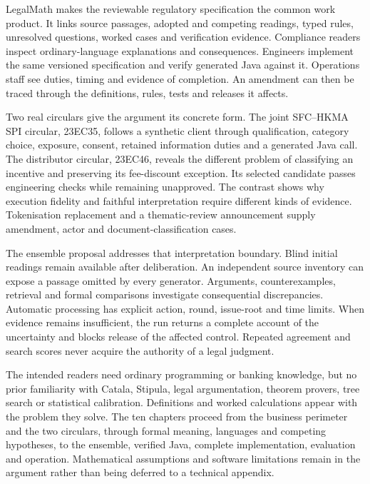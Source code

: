 \documentclass[12pt,a4paper,oneside,openany]{book}
\begin{document}
LegalMath makes the reviewable regulatory specification the common work product.
It links source passages, adopted and competing readings, typed rules, unresolved
questions, worked cases and verification evidence. Compliance readers inspect
ordinary-language explanations and consequences. Engineers implement the same
versioned specification and verify generated Java against it. Operations staff
see duties, timing and evidence of completion. An amendment can then be traced
through the definitions, rules, tests and releases it affects.

Two real circulars give the argument its concrete form. The joint SFC--HKMA SPI
circular, 23EC35, follows a synthetic client through qualification, category
choice, exposure, consent, retained information duties and a generated Java
call. The distributor circular, 23EC46, reveals the different problem of
classifying an incentive and preserving its fee-discount exception. Its selected
candidate passes engineering checks while remaining unapproved. The contrast
shows why execution fidelity and faithful interpretation require different
kinds of evidence. Tokenisation replacement and a thematic-review announcement
supply amendment, actor and document-classification cases.

The ensemble proposal addresses that interpretation boundary. Blind initial
readings remain available after deliberation. An independent source inventory
can expose a passage omitted by every generator. Arguments, counterexamples,
retrieval and formal comparisons investigate consequential discrepancies.
Automatic processing has explicit action, round, issue-root and time limits.
When evidence remains insufficient, the run returns a complete account of the
uncertainty and blocks release of the affected control. Repeated agreement and
search scores never acquire the authority of a legal judgment.

The intended readers need ordinary programming or banking knowledge, but no
prior familiarity with Catala, Stipula, legal argumentation, theorem provers,
tree search or statistical calibration. Definitions and worked calculations
appear with the problem they solve. The ten chapters proceed from the business
perimeter and the two circulars, through formal meaning, languages and competing
hypotheses, to the ensemble, verified Java, complete implementation, evaluation
and operation. Mathematical assumptions and software limitations remain in the
argument rather than being deferred to a technical appendix.
\end{document}
